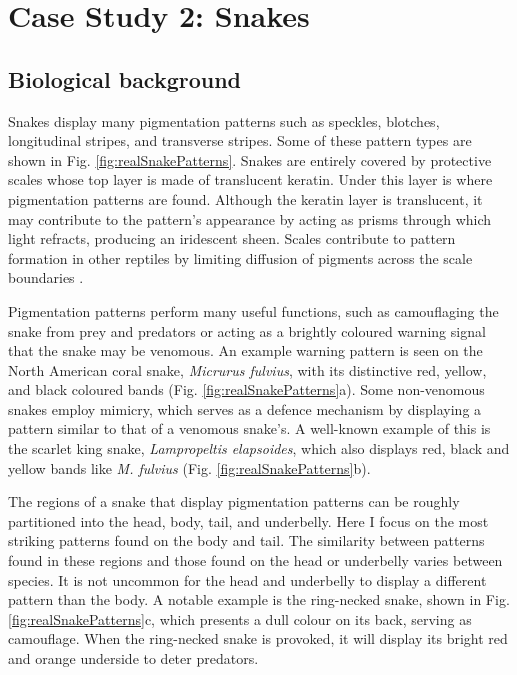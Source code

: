 \chapter{Case Study 2: Snakes}

\section{Biological background}
Snakes display many pigmentation patterns such as speckles, blotches, longitudinal stripes, and transverse stripes. Some of these pattern types are shown in Fig. \ref{fig:realSnakePatterns}. Snakes are entirely covered by protective scales whose top layer is made of translucent keratin. Under this layer is where pigmentation patterns are found. Although the keratin layer is translucent, it may contribute to the pattern's appearance by acting as prisms through which light refracts, producing an iridescent sheen. Scales contribute to pattern formation in other reptiles by limiting diffusion of pigments across the scale boundaries \citep{manukyan2017}.

Pigmentation patterns perform many useful functions, such as camouflaging the snake from prey and predators or acting as a brightly coloured warning signal that the snake may be venomous. An example warning pattern is seen on the North American coral snake, \textit{Micrurus fulvius}, with its distinctive red, yellow, and black coloured bands (Fig. \ref{fig:realSnakePatterns}a). Some non-venomous snakes employ mimicry, which serves as a defence mechanism by displaying a pattern similar to that of a venomous snake's. A well-known example of this is the scarlet king snake, \textit{Lampropeltis elapsoides}, which also displays red, black and yellow bands like \textit{M. fulvius} (Fig. \ref{fig:realSnakePatterns}b).

The regions of a snake that display pigmentation patterns can be roughly partitioned into the head, body, tail, and underbelly. Here I focus on the most striking patterns found on the body and tail. The similarity between patterns found in these regions and those found on the head or underbelly varies between species. It is not uncommon for the head and underbelly to display a different pattern than the body. A notable example is the ring-necked snake, shown in Fig. \ref{fig:realSnakePatterns}c, which presents a dull colour on its back, serving as camouflage. When the ring-necked snake is provoked, it will display its bright red and orange underside to deter predators.

